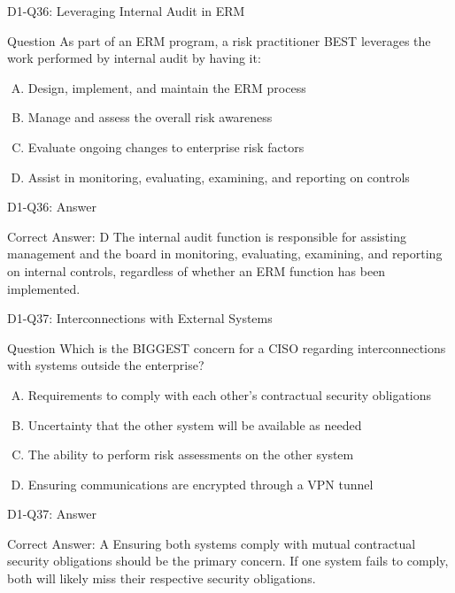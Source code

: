\documentclass{beamer}
\begin{document}
	\begin{frame}{D1-Q36: Leveraging Internal Audit in ERM}
		\begin{block}{Question}
			As part of an ERM program, a risk practitioner BEST leverages the work performed by internal audit by having it:
		\end{block}
		\begin{enumerate}[(A)]
			\item Design, implement, and maintain the ERM process
			\item Manage and assess the overall risk awareness
			\item Evaluate ongoing changes to enterprise risk factors
			\item Assist in monitoring, evaluating, examining, and reporting on controls
		\end{enumerate}
	\end{frame}
	\begin{frame}{D1-Q36: Answer}
		\begin{block}{Correct Answer: D}
			The internal audit function is responsible for assisting management and the board in monitoring, evaluating, examining, and reporting on internal controls, regardless of whether an ERM function has been implemented.
		\end{block}
	\end{frame}
	
	\begin{frame}{D1-Q37: Interconnections with External Systems}
		\begin{block}{Question}
			Which is the BIGGEST concern for a CISO regarding interconnections with systems outside the enterprise?
		\end{block}
		\begin{enumerate}[(A)]
			\item Requirements to comply with each other's contractual security obligations
			\item Uncertainty that the other system will be available as needed
			\item The ability to perform risk assessments on the other system
			\item Ensuring communications are encrypted through a VPN tunnel
		\end{enumerate}
	\end{frame}
	\begin{frame}{D1-Q37: Answer}
		\begin{block}{Correct Answer: A}
			Ensuring both systems comply with mutual contractual security obligations should be the primary concern. If one system fails to comply, both will likely miss their respective security obligations.
		\end{block}
	\end{frame}
	
\end{document}
